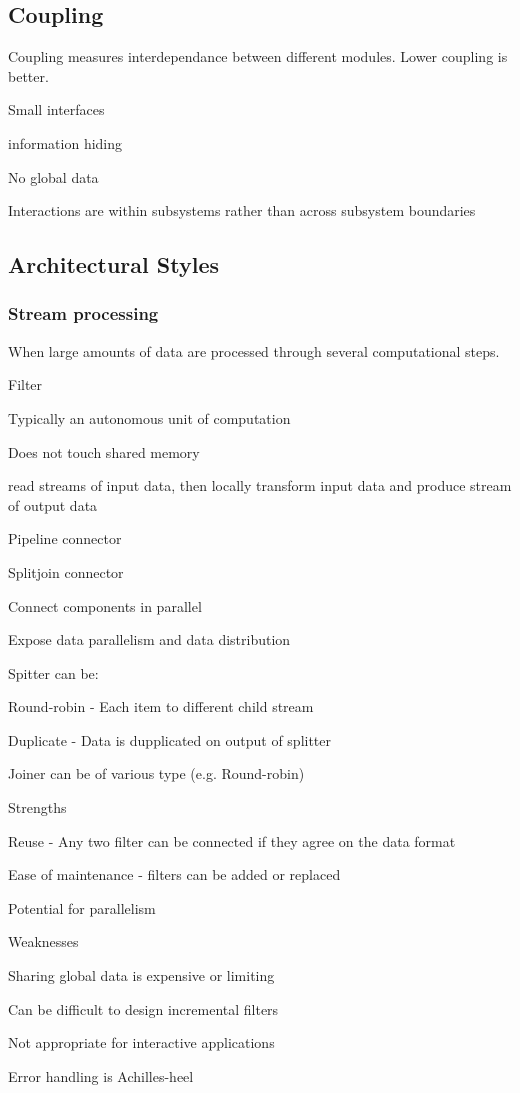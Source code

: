 \documentclass[10pt]{article}
\begin{document}
\subsection{Coupling}
Coupling measures interdependance between different modules. Lower coupling is better.
\enumstart
	\item Small interfaces
	\item information hiding
	\item No global data
	\item Interactions are within subsystems rather than across subsystem boundaries
\enumend

\subsection{Architectural Styles}

\subsubsection{Stream processing}
When large amounts of data are processed through several computational steps.
\enumstart
	\item Filter
	\enumstart
		\item Typically an autonomous unit of computation
		\item Does not touch shared memory
		\item read streams of input data, then locally transform input data and produce stream of output data
	\enumend
	\item Pipeline connector
	\item Splitjoin connector
	\enumstart
		\item Connect components in parallel
		\item Expose data parallelism and data distribution
		\item Spitter can be:
		\enumstart
			\item Round-robin - Each item to different child stream
			\item Duplicate - Data is dupplicated on output of splitter
		\enumend
		\item Joiner can be of various type (e.g. Round-robin)
	\enumend
	\item Strengths
	\enumstart
		\item Reuse - Any two filter can be connected if they agree on the data format
		\item Ease of maintenance - filters can be added or replaced
		\item Potential for parallelism
	\enumend
	\item Weaknesses
	\enumstart
		\item Sharing global data is expensive or limiting
		\item Can be difficult to design incremental filters
		\item Not appropriate for interactive applications
		\item Error handling is Achilles-heel
	\enumend
\enumend
\end{document}
